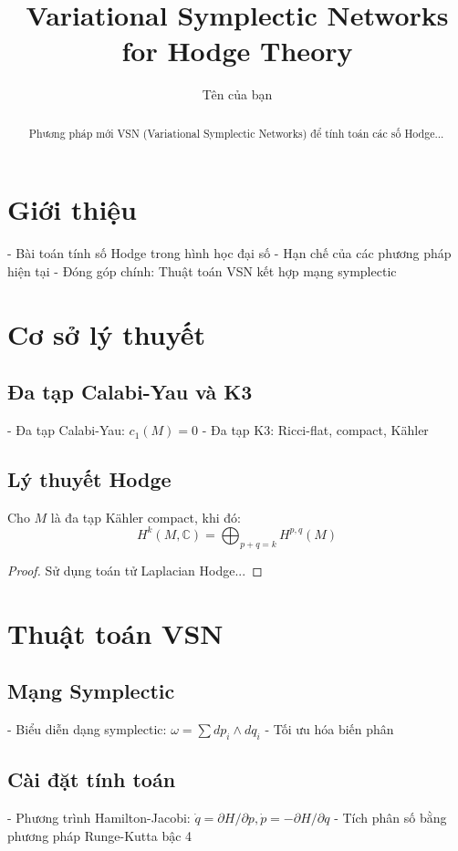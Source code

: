 \documentclass{article}
\title{Variational Symplectic Networks for Hodge Theory}
\author{Tên của bạn}
\begin{document}
\maketitle

\begin{abstract}
Phương pháp mới VSN (Variational Symplectic Networks) để tính toán các số Hodge...
\end{abstract}

\section{Giới thiệu}
- Bài toán tính số Hodge trong hình học đại số
- Hạn chế của các phương pháp hiện tại
- Đóng góp chính: Thuật toán VSN kết hợp mạng symplectic

\section{Cơ sở lý thuyết}
\subsection{Đa tạp Calabi-Yau và K3}
- Đa tạp Calabi-Yau: $c_1(M) = 0$
- Đa tạp K3: Ricci-flat, compact, Kähler

\subsection{Lý thuyết Hodge}
\begin{theorem}
Cho $M$ là đa tạp Kähler compact, khi đó:
\[
H^k(M, \mathbb{C}) = \bigoplus_{p+q=k} H^{p,q}(M)
\]
\end{theorem}
\begin{proof}
Sử dụng toán tử Laplacian Hodge...
\end{proof}

\section{Thuật toán VSN}
\subsection{Mạng Symplectic}
- Biểu diễn dạng symplectic: $\omega = \sum dp_i \wedge dq_i$
- Tối ưu hóa biến phân

\subsection{Cài đặt tính toán}
- Phương trình Hamilton-Jacobi: $\dot{q} = \partial H/\partial p, \dot{p} = -\partial H/\partial q$
- Tích phân số bằng phương pháp Runge-Kutta bậc 4
\end{document}
